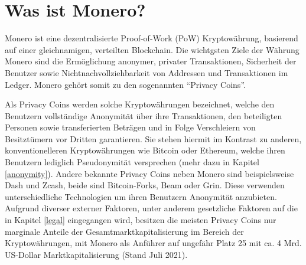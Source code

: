 \chapter{Was ist Monero?}
Monero ist eine dezentralisierte Proof-of-Work (PoW) Kryptowährung, basierend auf einer gleichnamigen, verteilten Blockchain\cite[vgl. Abstract]{Koe2020}.
Die wichtgsten Ziele der Währung Monero sind die Ermöglichung anonymer, privater Transaktionen, Sicherheit der Benutzer sowie Nichtnachvollziehbarkeit von Addressen und Transaktionen im Ledger.
Monero gehört somit zu den sogenannten ``Privacy Coins''.

Als Privacy Coins werden solche Kryptowährungen bezeichnet, welche den Benutzern vollständige Anonymität über ihre Transaktionen, den beteiligten Personen sowie transferierten Beträgen
und in Folge Verschleiern von Besitztümern vor Dritten garantieren.
Sie stehen hiermit im Kontrast zu anderen, konventionelleren Kryptowährungen wie Bitcoin oder Ethereum, welche ihren Benutzern lediglich Pseudonymität versprechen\cite{Vermaak2021} (mehr dazu in Kapitel \ref{anonymity}).
Andere bekannte Privacy Coins neben Monero sind beispielsweise Dash und Zcash, beide sind Bitcoin-Forks, Beam oder Grin. Diese verwenden unterschiedliche Technologien um ihren Benutzern Anonymität anzubieten.\\
Aufgrund diverser externer Faktoren, unter anderem gesetzliche Faktoren auf die in Kapitel \ref{legal} eingegangen wird, besitzen die meisten Privacy Coins nur marginale Anteile der Gesamtmarktkapitalisierung im Bereich der Kryptowährungen, 
mit Monero als Anführer auf ungefähr Platz 25 mit ca. 4 Mrd. US-Dollar Marktkapitalisierung (Stand Juli 2021)\cite{CoinMarketCap2021}.


